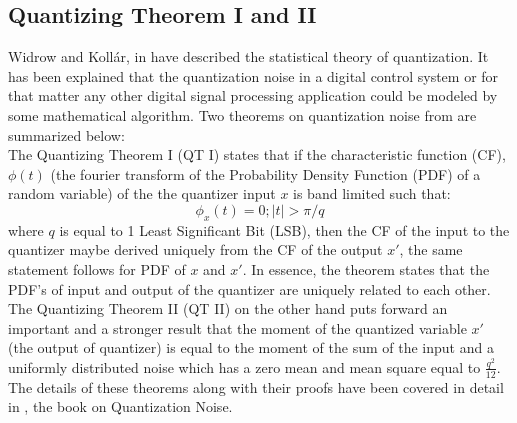 \documentclass[colorlinks=true,pdfstartview=FitV,linkcolor=blue,
            citecolor=red,urlcolor=magenta]{ligodoc}
\begin{document}
\subsection{Quantizing Theorem I and II} Widrow and Koll\'ar, in \cite{Kollar} have described the statistical theory of quantization. It has been explained that the quantization noise in a digital control system or for that matter any other digital signal processing application could be modeled by some mathematical algorithm. Two theorems on quantization noise from \cite{Kollar} are summarized below:\\
The Quantizing Theorem I (QT I) states that if the characteristic function (CF), $\phi(t)$ (the fourier transform of the Probability Density Function (PDF) of a random variable) of the the quantizer input $x$ is band limited such that:
	\begin{equation}
		\phi_x(t) = 0 ; |t| >\pi/q  
	\end{equation}
where $q$ is equal to 1 Least Significant Bit (LSB), then the CF of the input to the quantizer maybe derived uniquely from the CF of the output $x'$, the same statement follows for PDF of $x$ and $x'$. In essence, the theorem states that the PDF's of input and output of the quantizer are uniquely related to each other.\\
The Quantizing Theorem II (QT II) on the other hand puts forward an important and a stronger result that the moment of the quantized variable $x'$ (the output of quantizer) is equal to the moment of the sum of the input and a uniformly distributed noise which has a zero mean and mean square equal to $\frac{q^{2}}{12}$. \\
The details of these theorems along with their proofs have been covered in detail in \cite{Kollar}, the book on Quantization Noise.
\end{document}
